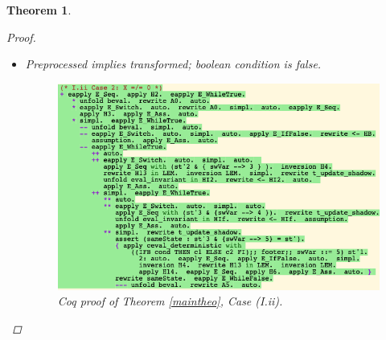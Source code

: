 \documentclass[12pt,notitlepage]{report}
\theoremstyle{plain}
\newtheorem{theo}{Theorem}[section]
\theoremstyle{definition}
\numberwithin{equation}{section}
\begin{document}
\begin{theo}
\begin{proof}
\begin{itemize}
\begin{itemize}
That is, we now take the next few lines to prove the following two goals.
\begin{verbatim}
______________________________________(1/2)
((IFB cond THEN c1 ELSE c2 FI);; footer;; swVar ::= 5) /
st'1 \\ st'3 & {swVar --> 5}
______________________________________(2/2)
((IFB cond THEN c1 ELSE c2 FI);; footer;; swVar ::= 5) /
st'1 \\ st'
\end{verbatim}
This is fairly straightforward, and we now get the new hypothesis
\begin{verbatim}
sameState : st'3 & {swVar --> 5} = st'
\end{verbatim}
We \verb$rewrite sameState$ so that our goal now has \verb$st'$ as both the start and end state, and is now in the correct form for \verb$eapply E_WhileFalse$.  All that remains to be done now is to show
\begin{verbatim}
______________________________________(1/1)
beval st' (swVar <= 4) = false.
\end{verbatim}
But after an \verb$unfold$, we \verb$rewrite A5$ (recall this is the assertion we made, what seems now like a lifetime ago, that the value of \verb$swVar$ in the final state is 5).  Coq is smart enough to know \verb$5 <= 4 = false$, and so we finish this subcase with an \verb$auto$.
                \item[(I.ii)] Preprocessed implies transformed; boolean condition is false.
                
                \noindent\begin{figure}[H]
        \centering
        \includegraphics[scale=0.6]{alltrans_1_2}
        \caption{Coq proof of Theorem \ref{maintheo}, Case (I.ii).}
        \label{fig:maintheo12}
        \end{figure}
                

\end{itemize}
\end{itemize}
\end{proof}
\end{theo}
\end{document}
